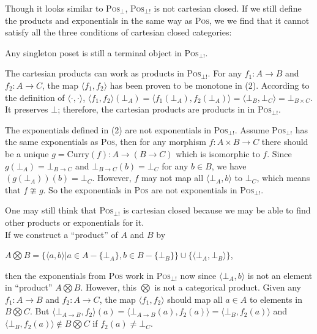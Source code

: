 \begin{myitemize}
Though it looks similar to \textsc{Pos}$_\bot$, \textsc{Pos}$_{\bot !}$ is not cartesian closed. If we still define the products and exponentials in the same way as \textsc{Pos}, we we find that it cannot satisfy all the three conditions of cartesian closed categories:
\begin{myitemize}
\item Any singleton poset is still a terminal object in \textsc{Pos}$_{\bot !}$.
\item The cartesian products can work as products in \textsc{Pos}$_{\bot !}$. For any $ f_1: A \to B $ and $ f_2: A \to C $, the map $ \langle f_1, f_2 \rangle $ has been proven to be monotone in (2). According to the definition of $ \langle \cdot, \cdot \rangle $, $ \langle f_1, f_2 \rangle (\bot_A) = \langle f_1(\bot_A), f_2(\bot_A) \rangle = \langle \bot_B, \bot_C \rangle = \bot_{B \times C} $. It preserves $ \bot $; therefore, the cartesian products are products in in \textsc{Pos}$_{\bot !}$.
\item The exponentials defined in (2) are not exponentials in \textsc{Pos}$_{\bot !}$. Assume \textsc{Pos}$_{\bot !}$ has the same exponentials as \textsc{Pos}, then for any morphism $ f: A \times B \to C $ there should be a unique $ g = \text{Curry}(f): A \to (B \to C) $ which is isomorphic to $ f $. Since $ g(\bot _A)= \bot _{B \to C} $ and $ \bot _{B \to C} (b) = \bot _C $ for any $ b \in B $, we have $ (g(\bot _A))(b) = \bot _C $. However, $ f $ may not map all $ \langle \bot _A , b \rangle $ to $ \bot _C $, which means that $ f \ncong g $. So the exponentials in \textsc{Pos} are not exponentials in \textsc{Pos}$_{\bot !}$.
\end{myitemize}
One may still think that \textsc{Pos}$_{\bot !}$ is cartesian closed because we may be able to find other products or exponentials for it.\\
If we construct a ``product'' of $ A $ and $ B $ by
\begin{center}
$ A \bigotimes B = \{ \langle a,b \rangle | a \in A - \{ \bot_A \}, b \in B -\{ \bot_B \} \} \cup \{ \langle \bot_A, \bot_B \rangle \} $,
\end{center}
then the exponentials from \textsc{Pos} work in \textsc{Pos}$_{\bot !}$ now since $ \langle \bot_A,b \rangle $ is not an element in ``product'' $ A \bigotimes B $. However, this $ \bigotimes $ is not a categorical product. Given any $ f_1: A \to B $ and $ f_2: A \to C $, the map $ \langle f_1, f_2 \rangle $ should map all $ a \in A $ to elements in $ B \bigotimes C $. But $ \langle \bot_{A \to B}, f_2 \rangle (a) = \langle \bot_{A \to B}(a), f_2(a) \rangle = \langle \bot_B, f_2(a) \rangle $ and $ \langle \bot_B, f_2(a) \rangle \not\in B \bigotimes C $ if $ f_2(a) \neq \bot_C $.\\

\end{myitemize}
